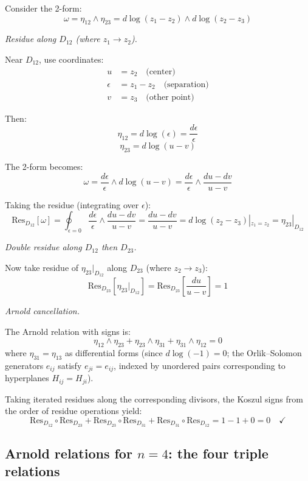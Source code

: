 \begin{computation}\label{comp:explicit-residues}
Consider the 2-form:
\[\omega = \eta_{12} \wedge \eta_{23} = d\log(z_1 - z_2) \wedge d\log(z_2 - z_3)\]

\emph{Residue along $D_{12}$ (where $z_1 \to z_2$).}

Near $D_{12}$, use coordinates:
\begin{align*}
u &= z_2 \quad \text{(center)}\\
\epsilon &= z_1 - z_2 \quad \text{(separation)}\\
v &= z_3 \quad \text{(other point)}
\end{align*}

Then:
\[\eta_{12} = d\log(\epsilon) = \frac{d\epsilon}{\epsilon}\]
\[\eta_{23} = d\log(u - v)\]

The 2-form becomes:
\[\omega = \frac{d\epsilon}{\epsilon} \wedge d\log(u - v) = \frac{d\epsilon}{\epsilon} 
\wedge \frac{du - dv}{u - v}\]

Taking the residue (integrating over $\epsilon$):
\[\text{Res}_{D_{12}}[\omega] = \oint_{\epsilon=0} \frac{d\epsilon}{\epsilon} \wedge 
\frac{du - dv}{u - v} = \frac{du - dv}{u - v} = d\log(z_2 - z_3)|_{z_1 = z_2} = \eta_{23}|_{D_{12}}\]

\emph{Double residue along $D_{12}$ then $D_{23}$.}

Now take residue of $\eta_{23}|_{D_{12}}$ along $D_{23}$ (where $z_2 \to z_3$):
\[\text{Res}_{D_{23}}[\eta_{23}|_{D_{12}}] = \text{Res}_{D_{23}}\left[\frac{du}{u-v}\right]
= 1\]

\emph{Arnold cancellation.}

The Arnold relation with signs is:
\[\eta_{12} \wedge \eta_{23} + \eta_{23} \wedge \eta_{31} + \eta_{31} \wedge \eta_{12} = 0\]
where $\eta_{31} = \eta_{13}$ as differential forms (since $d\log(-1) = 0$; the Orlik--Solomon generators $e_{ij}$ satisfy $e_{ji} = e_{ij}$, indexed by unordered pairs corresponding to hyperplanes $H_{ij} = H_{ji}$).

Taking iterated residues along the corresponding divisors, the Koszul signs from the order of residue operations yield:
\[\text{Res}_{D_{12}} \circ \text{Res}_{D_{23}} + \text{Res}_{D_{23}} \circ \text{Res}_{D_{31}}
+ \text{Res}_{D_{31}} \circ \text{Res}_{D_{12}} = 1 - 1 + 0 = 0 \quad \checkmark\]
\end{computation}

\subsection{\texorpdfstring{Arnold relations for $n=4$: the four triple relations}{Arnold relations for n=4: the four triple relations}}

